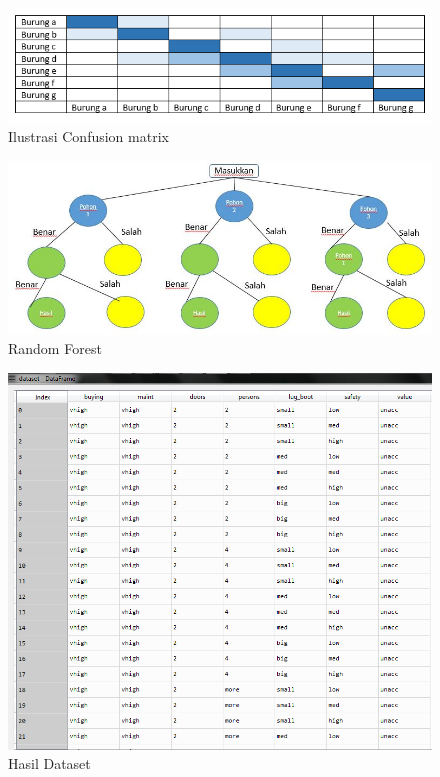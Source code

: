 \begin{figure}[ht]
      \centerline{\includegraphics[width=1\textwidth]
      {figures/cokro/c38}}
      \caption{Ilustrasi Confusion matrix}
      \label{c38}
      \end{figure}


\begin{figure}[ht]
	\centerline{\includegraphics[width=1\textwidth]{figures/huda/chapter3/1.JPG}}
	\caption{Random Forest}
	\label{h1}
\end{figure}

\begin{figure}[ht]
	\centerline{\includegraphics[width=1\textwidth]{figures/huda/chapter3/2.PNG}}
	\caption{Hasil Dataset}
	\label{h2}
\end{figure}

